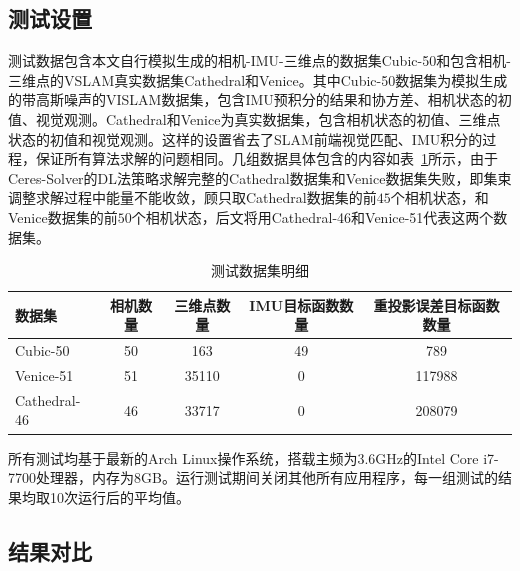 \subsection{测试设置}

测试数据包含本文自行模拟生成的相机-IMU-三维点的数据集Cubic-50和包含相机-三维点的VSLAM真实数据集Cathedral\citep{kim2014influence}和Venice\citep{kummerle2011g}。其中Cubic-50数据集为模拟生成的带高斯噪声的VISLAM数据集，包含IMU预积分的结果和协方差、相机状态的初值、视觉观测。Cathedral和Venice为真实数据集，包含相机状态的初值、三维点状态的初值和视觉观测。这样的设置省去了SLAM前端视觉匹配、IMU积分的过程，保证所有算法求解的问题相同。几组数据具体包含的内容如表~\ref{tab:dataset}所示，由于Ceres-Solver的DL法策略求解完整的Cathedral数据集和Venice数据集失败，即集束调整求解过程中能量不能收敛，顾只取Cathedral数据集的前$45$个相机状态，和Venice数据集的前$50$个相机状态，后文将用Cathedral-46和Venice-51代表这两个数据集。

{
\linespread{1}
\begin{table}[htb!]
\caption{测试数据集明细}
\label{tab:dataset}
\centering
\begin{tabular}{l|cccc}
    \toprule
    数据集       & 相机数量 & 三维点数量 & IMU目标函数数量 & 重投影误差目标函数数量 \\ \midrule
    Cubic-50     &       50 &        163 &              49 &                    789 \\
    Venice-51    &       51 &      35110 &               0 &                 117988 \\
    Cathedral-46 &       46 &      33717 &               0 &                 208079 \\
    \bottomrule
\end{tabular}
\end{table}
}

所有测试均基于最新的Arch Linux操作系统，搭载主频为3.6GHz的Intel Core i7-7700处理器，内存为8GB。运行测试期间关闭其他所有应用程序，每一组测试的结果均取10次运行后的平均值。

\subsection{结果对比}

